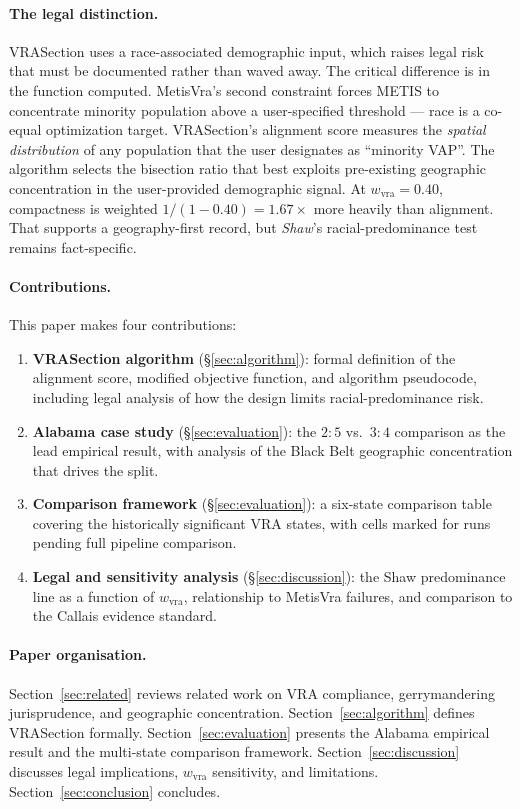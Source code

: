 \paragraph{The legal distinction.}
VRASection uses a race-associated demographic input, which raises legal risk
that must be documented rather than waved away.
The critical difference is in the function computed.
MetisVra's second constraint forces METIS to concentrate minority
population above a user-specified threshold --- race is a co-equal
optimization target.
VRASection's alignment score measures the \emph{spatial distribution}
of any population that the user designates as ``minority VAP''.
The algorithm selects the bisection ratio that best exploits pre-existing
geographic concentration in the user-provided demographic signal.
At $w_\text{vra} = 0.40$, compactness is weighted $1 / (1 - 0.40) = 1.67\times$
more heavily than alignment.  That supports a geography-first record, but
\emph{Shaw}'s racial-predominance test remains fact-specific.

\paragraph{Contributions.}
This paper makes four contributions:

\begin{enumerate}
\item \textbf{VRASection algorithm} (\S\ref{sec:algorithm}): formal
  definition of the alignment score, modified objective function, and
  algorithm pseudocode, including legal analysis of how the design limits
  racial-predominance risk.

\item \textbf{Alabama case study} (\S\ref{sec:evaluation}): the $2:5$
  vs.\ $3:4$ comparison as the lead empirical result, with analysis of
  the Black Belt geographic concentration that drives the split.

\item \textbf{Comparison framework} (\S\ref{sec:evaluation}): a six-state
  comparison table covering the historically significant VRA states,
  with cells marked for runs pending full pipeline comparison.

\item \textbf{Legal and sensitivity analysis} (\S\ref{sec:discussion}):
  the Shaw predominance line as a function of $w_\text{vra}$, relationship
  to MetisVra failures, and comparison to the Callais evidence standard.
\end{enumerate}

\paragraph{Paper organisation.}
Section~\ref{sec:related} reviews related work on VRA compliance,
gerrymandering jurisprudence, and geographic concentration.
Section~\ref{sec:algorithm} defines VRASection formally.
Section~\ref{sec:evaluation} presents the Alabama empirical result
and the multi-state comparison framework.
Section~\ref{sec:discussion} discusses legal implications, $w_\text{vra}$
sensitivity, and limitations.
Section~\ref{sec:conclusion} concludes.
